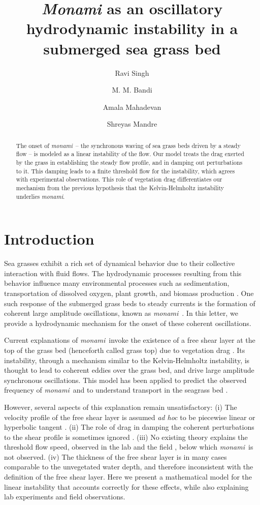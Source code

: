 \documentclass{jfm}
\title{\textit{Monami} as an oscillatory hydrodynamic instability in a submerged sea grass bed}
\author{Ravi Singh}
\affiliation{Brown University, Providence RI 02912 USA}
\author{M. M. Bandi}
\affiliation{OIST Graduate University, Okinawa 904-0495, Japan}
\author{Amala Mahadevan}
\affiliation{Woods Hole Oceanographic Institution, Woods Hole MA 02543 USA}
\author{Shreyas Mandre}
\affiliation{Brown University, Providence RI 02912 USA}
\newcommand{\monami}{\textit{monami}}
\begin{document}
\maketitle

\begin{abstract}
The onset of \monami ~-- the synchronous waving of sea grass beds driven by a steady flow -- is modeled as a linear instability of the flow. Our model treats the drag exerted by the grass in establishing the steady flow profile, and in damping out perturbations to it. This damping leads to a finite threshold flow for the instability, which agrees with experimental observations. This role of vegetation drag differentiates our mechanism from the previous hypothesis that the Kelvin-Helmholtz instability underlies \monami.
\end{abstract}

\maketitle
\section{Introduction}
Sea grasses exhibit a rich set of dynamical behavior due to their collective interaction with fluid flows.  
The hydrodynamic processes resulting from this behavior influence many environmental processes such as sedimentation, transportation of dissolved oxygen, plant growth, and biomass production  \cite{Fonseca87,Grizzle96,Nepf99,Nepf2012}. 
One such response of the submerged grass beds to steady currents is the formation of coherent large amplitude oscillations, known as \monami ~\cite{AckermanOkubo93}.  
In this letter, we provide a hydrodynamic mechanism for the onset of these coherent oscillations.

Current explanations of \monami ~invoke the existence of a free shear layer at the top of the grass bed (henceforth called grass top) due to vegetation drag  \cite{Ikeda96,Ghisal02,Raupach96}. 
Its instability, through a mechanism similar to the Kelvin-Helmholtz instability, is thought to lead to coherent eddies over the grass bed, and drive large amplitude synchronous oscillations.
This model has been applied to predict the observed frequency of \monami~and to understand transport in the seagrass bed \cite{Nepf00,Ghisal02,Nepf04,Okamoto12}.

However, several aspects of this explanation remain unsatisfactory: 
(i)   The velocity profile of the free shear layer is assumed \textit{ad hoc} to be piecewise linear \cite{Delangre06} or hyperbolic tangent \cite{Ghisal02,Raupach96}. 
(ii)  The role of drag in damping the coherent perturbations to the shear profile is sometimes ignored \cite{Raupach96}. 
(iii) No existing theory explains the threshold flow speed, observed in the lab \cite{Ghisal02} and the field \cite{Grizzle96}, below which \monami ~is not observed.
(iv)  The thickness of the free shear layer is in many cases comparable to the unvegetated water depth, and therefore inconsistent with the definition of the free shear layer.
Here we present a mathematical model for the linear instability that accounts correctly for these effects, while also explaining lab experiments and field observations.
\end{document}
